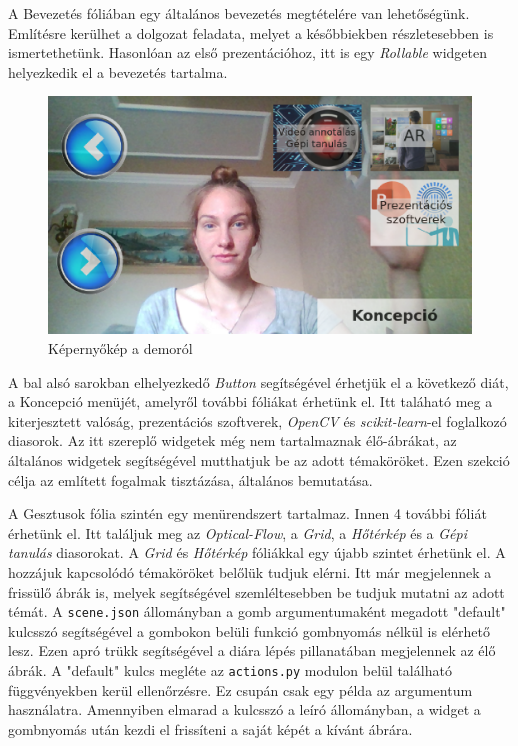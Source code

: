 A Bevezetés fóliában egy általános bevezetés megtételére van lehetőségünk. Említésre kerülhet a dolgozat feladata, melyet a későbbiekben részletesebben is ismertethetünk. Hasonlóan az első prezentációhoz, itt is egy \textit{Rollable} widgeten helyezkedik el a bevezetés tartalma.

\begin{figure}[h]
\centering
\includegraphics[width=12truecm]{images/dolgozat_demo_screenshot.png}
\caption{Képernyőkép a demoról}
\label{fig:dolgozatdemo}
\end{figure}

A bal alsó sarokban elhelyezkedő \textit{Button} segítségével érhetjük el a következő diát, a Koncepció menüjét, amelyről további fóliákat érhetünk el. Itt taláható meg a kiterjesztett valóság, prezentációs szoftverek, \textit{OpenCV} és \textit{scikit-learn}-el foglalkozó diasorok. Az itt szereplő widgetek még nem tartalmaznak élő-ábrákat, az általános widgetek segítségével mutthatjuk be az adott témaköröket. Ezen szekció célja az említett fogalmak tisztázása, általános bemutatása.

A Gesztusok fólia szintén egy menürendszert tartalmaz. Innen 4 további fóliát érhetünk el.
Itt találjuk meg az \textit{Optical-Flow}, a \textit{Grid}, a \textit{Hőtérkép} és a \textit{Gépi tanulás} diasorokat. A \textit{Grid} és \textit{Hőtérkép} fóliákkal egy újabb szintet érhetünk el. A hozzájuk kapcsolódó témaköröket belőlük tudjuk elérni. Itt már megjelennek a frissülő ábrák is, melyek segítségével szemléltesebben be tudjuk mutatni az adott témát.
A \texttt{scene.json} állományban a gomb argumentumaként megadott "default" kulcsszó segítségével a gombokon belüli funkció gombnyomás nélkül is elérhető lesz. Ezen apró trükk segítségével a diára lépés pillanatában megjelennek az élő ábrák. A "default" kulcs megléte az \texttt{actions.py} modulon belül található függvényekben kerül ellenőrzésre. Ez csupán csak egy példa az argumentum használatra. Amennyiben elmarad a kulcsszó a leíró állományban, a widget a gombnyomás után kezdi el frissíteni a saját képét a kívánt ábrára.

